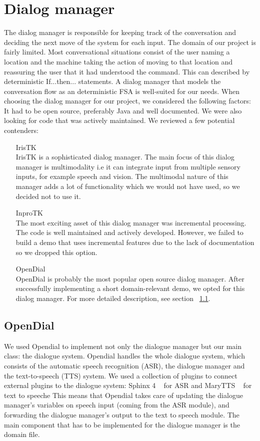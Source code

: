 \documentclass[a4paper, 12pt]{article}
\begin{document}
\section{Dialog manager}
The dialog manager is responsible for keeping track of the conversation and deciding the next move of the system for each input. The domain of our project is fairly limited. Most conversational situations consist of the user naming a location and the machine taking the action of moving to that location and reassuring the user that it had understood the command. This can described by deterministic If...then... statements. A dialog manager that models the conversation flow as an deterministic FSA is well-suited for our needs.
When choosing the dialog manager for our project, we considered the following factors: It had to be open source, preferably Java and well documented.
We were also looking for code that was actively maintained.
We reviewed a few potential contenders:
\begin{itemize}
\item[IrisTK] \hfill \\
IrisTK is a sophisticated dialog manager. The main focus of this dialog manager is multimodality i.e it can integrate input from multiple sensory inputs, for example speech and vision. The multimodal nature of this manager adds a lot of functionality which we would not have used, so we decided not to use it.
\item[InproTK] \hfill \\
The most exciting asset of this dialog manager was incremental processing.
The code is well maintained and actively developed. 
However, we failed to build a demo that uses incremental features due to the lack of documentation so we dropped this option.
\item[OpenDial] \hfill \\
OpenDial is probably the most popular open source dialog manager.
After successfully implementing a short domain-relevant demo, we opted for this dialog manager.
For more detailed description, see section ~\ref{sec:opendial}.
\end{itemize}

\subsection{OpenDial}
\label{sec:opendial}
We used Opendial to implement not only the dialogue manager but our main class: the dialogue system. 
Opendial handles the whole dialogue system, which consists of the automatic speech recognition (ASR), the dialogue manager and the text-to-speech (TTS) system. 
We used a collection of plugins to connect external plugins to the dialogue system: Sphinx 4 ~\cite{Walker:2004:SFO:1698193} for ASR and MaryTTS ~\cite{marytts} for text to speeche 
This means that Opendial takes care of updating the dialogue manager's variables on speech input (coming from the ASR module), and forwarding the dialogue manager's output to the text to speech module. 
The main component that has to be implemented for the dialogue manager is the domain file. \\
\end{document}
